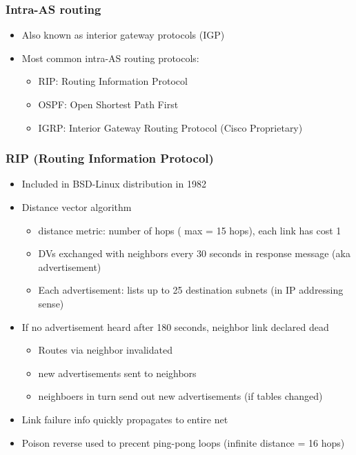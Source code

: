 \documentclass[11pt]{article}
\begin{document}
\subsubsection{Intra-AS routing}
\label{sec:orgd9548e1}
\begin{itemize}
\item Also known as interior gateway protocols (IGP)
\item Most common intra-AS routing protocols:
\begin{itemize}
\item RIP: Routing Information Protocol
\item OSPF: Open Shortest Path First
\item IGRP: Interior Gateway Routing Protocol (Cisco Proprietary)
\end{itemize}
\end{itemize}

\subsubsection{RIP (Routing Information Protocol)}
\label{sec:orgccc962e}
\begin{itemize}
\item Included in BSD-Linux distribution in 1982
\item Distance vector algorithm
\begin{itemize}
\item distance metric: number of hops ( max = 15 hops), each link has
cost 1
\item DVs exchanged with neighbors every 30 seconds in response message
(aka advertisement)
\item Each advertisement: lists up to 25 destination subnets (in IP
addressing sense)
\end{itemize}

\item If no advertisement heard after 180 seconds, neighbor link declared
dead
\begin{itemize}
\item Routes via neighbor invalidated

\item new advertisements sent to neighbors

\item neighboers in turn send out new advertisements (if tables changed)
\end{itemize}
\item Link failure info quickly propagates to entire net
\item Poison reverse used to precent ping-pong loops (infinite distance =
16 hops)
\end{itemize}
\end{document}
